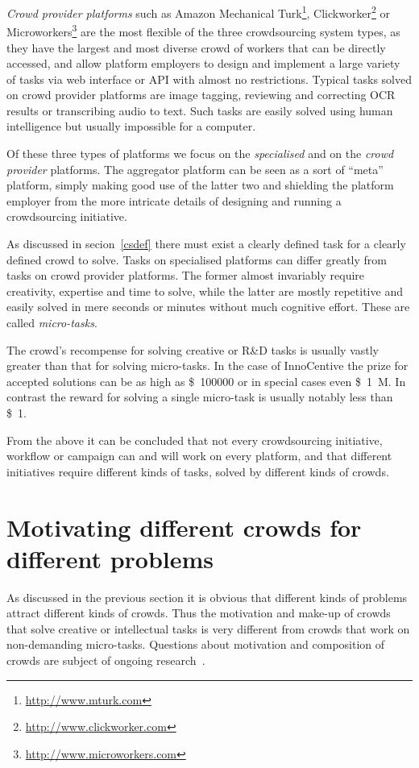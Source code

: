 \documentclass{sig-alternate}
\begin{document}
\emph{Crowd provider platforms} such as Amazon Mechanical
Turk\footnote{\url{http://www.mturk.com}},
Clickworker\footnote{\url{http://www.clickworker.com}} or
Microworkers\footnote{\url{http://www.microworkers.com}} are the most flexible
of the three crowdsourcing system types, as they have the largest and most diverse
crowd of workers that can be directly accessed, and allow platform employers to
design and implement a large variety of tasks via web interface or API with
almost no restrictions. Typical tasks solved on crowd provider platforms are
image tagging, reviewing and correcting OCR results or transcribing audio to
text. Such tasks are easily solved using human intelligence but usually
impossible for a computer.

Of these three types of platforms we focus on the \emph{specialised} and on the
\emph{crowd provider} platforms. The aggregator platform can be seen as a
sort of ``meta'' platform, simply making good use of the latter two and
shielding the platform employer from the more intricate details of designing
and running a crowdsourcing initiative.

As discussed in secion~\ref{csdef} there must exist a clearly defined task for
a clearly defined crowd to solve. Tasks on specialised platforms can differ
greatly from tasks on crowd provider platforms. The former almost invariably
require creativity, expertise and time to solve, while the latter are mostly
repetitive and easily solved in mere seconds or minutes without much cognitive
effort.  These are called \emph{micro-tasks}.

The crowd's recompense for solving creative or R\&D tasks is usually vastly
greater than that for solving micro-tasks. In the case of InnoCentive the prize
for accepted solutions can be as high as \SI{100000}[\$]{} or in special cases
even \SI{1}[\$]{M}. In contrast the reward for solving a single micro-task is
usually notably less than \SI{1}[\$]{}.

From the above it can be concluded that not every crowdsourcing initiative,
workflow or campaign can and will work on every platform, and that different
initiatives require different kinds of tasks, solved by different kinds of
crowds. 

\section{Motivating different crowds for different problems}

As discussed in the previous section it is obvious that different kinds of
problems attract different kinds of crowds. Thus the motivation and make-up of
crowds that solve creative or intellectual tasks is very different from crowds
that work on non-demanding micro-tasks. Questions about motivation and
composition of crowds are subject of ongoing
research~\cite{antikainen2010motivating, brabham2008moving, brabham2010moving,
	chandler2013breaking, horton2010labor, kaufmann2011more,
	mason2010financial}.
\end{document}
